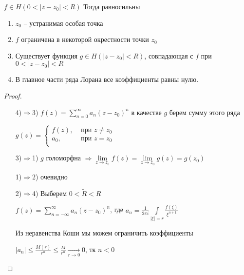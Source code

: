 \begin{theorem}\thmslashn
	
	$f\in H(0 < |z - z_0| < R)$ Тогда равносильны 
	
	\begin{enumerate}
		\item 
		$z_0$ -- устранимая особая точка
		
		\item
		$f$ ограничена в некоторой окрестности точки $z_0$
		
		\item
		Существует функция $g\in H(|z - z_0| < R)$, совпадающая с $f$ при $0 < |z - z_0| < R$
		
		\item
		В главное части ряда Лорана все коэффициенты равны нулю.
	\end{enumerate}
	
\end{theorem}

\begin{proof}\thmslashn
	
	\begin{enumerate}
		\item[4)$\Rightarrow$3)] 
		$f(z) = \sum\limits_{n=0}^{\infty}a_n(z-z_0)^n$ в качестве $g$ берем сумму этого ряда 
		
		$g(z) = \begin{cases}
		f(z), & \text{ при } z \not = z_0\\
		a_0, & \text{ при } z = z_0\\
		\end{cases}$
		
		\item[3)$\Rightarrow$1)] 
		$g$ голоморфна $\Rightarrow \lim\limits_{z \to z_0} f(z) = \lim\limits_{z \to z_0} g(z) = g(z_0)$
		
		\item[1)$\Rightarrow$2)] очевидно
		
		\item[2)$\Rightarrow$4)]
		Выберем $0 < \tilde{R} < R$ 
		
		$f(z) = \sum\limits_{n=-\infty}^{\infty} a_n(z-z_0)^n$, где $a_n = \frac{1}{2\pi i} \int\limits_{|\xi| = r}\frac{f(\xi)}{\xi^{n+1}}$
		
		Из неравенства Коши мы можем ограничить коэффициенты
		
		$|a_n| \leqslant \frac{M(r)}{r^n} \leqslant \frac{M}{r^n} \underset{r \to 0}\to 0$, тк $n < 0$
	\end{enumerate}
	
\end{proof}

